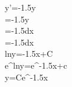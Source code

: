 y'=-1.5y\\
=-1.5y\\
=-1.5dx\\
\int {}=\int -1.5dx\\
lny=-1.5x+C\\
e^{lny}=e^{-1.5x+c}\\
y=Ce^{-1.5x}